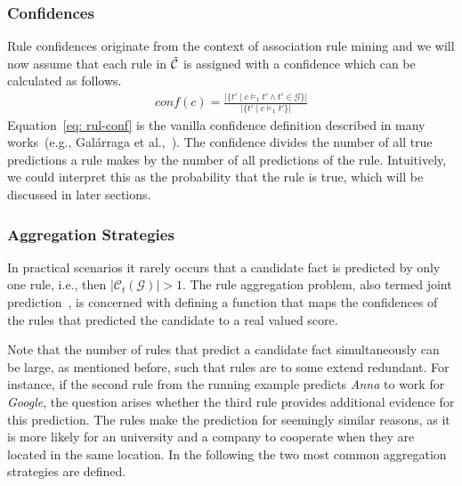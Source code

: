 \documentclass{article}
\theoremstyle{plain}
\theoremstyle{remark}
\newcommand{\allatomrules}{\Tilde{\mathcal{C}}}
\newcommand{\atomrule}{c}
\newcommand{\triple}{t}
\newcommand{\alltriples}{\mathcal{G}}
\newcommand{\tFiredAtomRulesG}{\mathcal{C}_\triple(\alltriples)}
\begin{document}
\subsubsection{Confidences}
Rule confidences originate from the context of association rule mining and we will now assume that each rule in $\allatomrules$ is assigned with a confidence which can be calculated as follows.
\begin{align}
    \textit{conf}(\atomrule) = \frac{\big|\{t' \; |\;  \atomrule \models_1 t' \land t' \in \alltriples \}\big|}{\big|\{t' \; |\;  \atomrule \models_1 t'\}\big|} \label{eq: rul-conf}
\end{align}
Equation~\eqref{eq: rul-conf} is the vanilla confidence definition described in many works~(e.g., Gal\'{a}rraga et al.,~). The confidence divides the number of all true predictions a rule makes by the number of all predictions of the rule. Intuitively, we could interpret this as the probability that the rule is true, which will be discussed in later sections. %

\subsubsection{Aggregation Strategies}
In practical scenarios it rarely occurs that a candidate fact is predicted by only one rule, i.e., then $|\tFiredAtomRulesG|>1$. The rule aggregation problem, also termed joint prediction~\cite{amieplus2015}, is concerned with defining a function that maps the confidences of the rules that predicted the candidate to a real valued score.

Note that the number of rules that predict a candidate fact simultaneously can be large, as mentioned before, such that rules are to some extend redundant. For instance, if the second rule from the running example predicts \textit{Anna} to work for \textit{Google}, the question arises whether the third rule provides additional evidence for this prediction. The rules make the prediction for seemingly similar reasons, as it is more likely for an university and a company to cooperate when they are located in the same location. In the following the two most common aggregation strategies are defined.
\end{document}
